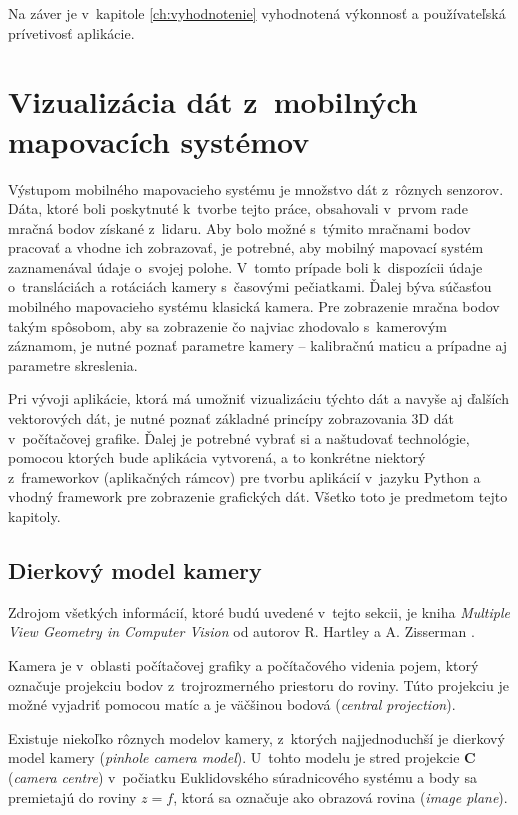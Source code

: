 Na záver je v~kapitole \ref{ch:vyhodnotenie} vyhodnotená výkonnosť a používateľská prívetivosť aplikácie. 

\chapter{Vizualizácia dát z~mobilných mapovacích systémov}
\label{ch:teoria}

Výstupom mobilného mapovacieho systému je množstvo dát z~rôznych senzorov. Dáta, ktoré boli poskytnuté k~tvorbe tejto práce, obsahovali v~prvom rade mračná bodov získané z~lidaru. Aby bolo možné s~týmito mračnami bodov pracovať a vhodne ich zobrazovať, je potrebné, aby mobilný mapovací systém zaznamenával údaje o~svojej polohe. V~tomto prípade boli k~dispozícii údaje o~transláciách a rotáciách kamery s~časovými pečiatkami. Ďalej býva súčasťou mobilného mapovacieho systému klasická kamera. Pre zobrazenie mračna bodov takým spôsobom, aby sa zobrazenie čo najviac zhodovalo s~kamerovým záznamom, je nutné poznať parametre kamery -- kalibračnú maticu a prípadne aj parametre skreslenia.

Pri vývoji aplikácie, ktorá má umožniť vizualizáciu týchto dát a navyše aj ďalších vektorových dát, je nutné poznať základné princípy zobrazovania 3D dát v~počítačovej grafike. Ďalej je potrebné vybrať si a naštudovať technológie, pomocou ktorých bude aplikácia vytvorená, a to konkrétne niektorý z~frameworkov (aplikačných rámcov) pre tvorbu aplikácií v~jazyku Python a vhodný framework pre zobrazenie grafických dát. Všetko toto je predmetom tejto kapitoly.

\section{Dierkový model kamery}

Zdrojom všetkých informácií, ktoré budú uvedené v~tejto sekcii, je kniha \emph{Multiple View Geometry in Computer Vision} od autorov R. Hartley a A. Zisserman \cite{multiple_view_geometry}.

Kamera je v~oblasti počítačovej grafiky a počítačového videnia pojem, ktorý označuje projekciu bodov z~trojrozmerného priestoru do roviny. Túto projekciu je možné vyjadriť pomocou matíc a je väčšinou bodová (\emph{central projection}).

Existuje niekoľko rôznych modelov kamery, z~ktorých najjednoduchší je dierkový model kamery (\emph{pinhole camera model}). U~tohto modelu je stred projekcie $\mathbf{C}$  (\emph{camera centre}) v~počiatku Euklidovského súradnicového systému a body sa premietajú do roviny $z = f$, ktorá sa označuje ako obrazová rovina (\emph{image plane}).

